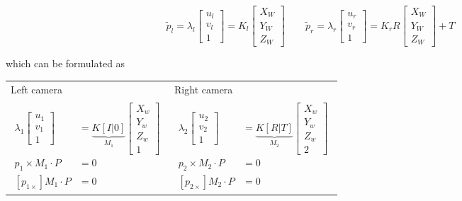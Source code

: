 \documentclass[10pt,a4paper]{scrartcl}
\begin{document}
\begin{multicols*}{2}
\begin{equation*}
\tilde{p}_l=\lambda_l\begin{bmatrix}u_l\\v_l\\1\end{bmatrix} = K_l\begin{bmatrix}X_W\\Y_W\\Z_W\end{bmatrix}\qquad \tilde{p}_r=\lambda_r\begin{bmatrix}u_r\\v_r\\1\end{bmatrix}=K_rR\begin{bmatrix}X_W\\Y_W\\Z_W\end{bmatrix}+T
\end{equation*}

\vspace{3ex}

which can be formulated as 

\vspace{3ex}

\begin{center}
\begin{tabular}{l|l}
Left camera&Right camera\\
$\begin{aligned}
\lambda_1\begin{bmatrix}
u_1\\v_1\\1
\end{bmatrix}&=\underbrace{K[I|0]}_{M_1}\begin{bmatrix}
X_w\\Y_w\\Z_w\\1
\end{bmatrix}\\
p_1\times M_1\cdot P &= 0\\
\left[p_{1\times}\right]M_1\cdot P &= 0
\end{aligned}$
&
$\begin{aligned}
\lambda_2\begin{bmatrix}
u_2\\v_2\\1
\end{bmatrix}&=\underbrace{K[R|T]}_{M_2}\begin{bmatrix}
X_w\\Y_w\\Z_w\\2
\end{bmatrix}\\
p_2\times M_2\cdot P &= 0\\
\left[p_{2\times}\right]M_2\cdot P&=0
\end{aligned}$
\end{tabular}
\end{center}


\end{multicols*}
\end{document}
